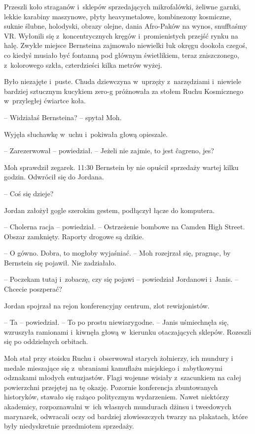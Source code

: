 \documentclass[oneside,polish,11pt,sfheadings]{mwbk}
\let\footnote=\endnote
\begin{document}
Przeszli koło straganów i~sklepów sprzedających mikrofalówki, żeliwne
garnki, lekkie karabiny maszynowe, płyty heavymetalowe, kombinezony
kosmiczne, suknie ślubne, holodyski, obrazy olejne, dania Afro-Paków na
wynos, snufftaśmy VR. Wyłonili się z~koncentrycznych kręgów i~promienistych przejść rynku na halę. Zwykłe miejsce Bernsteina zajmowało
niewielki łuk okręgu dookoła czegoś, co kiedyś musiało być fontanną pod
głównym świetlikiem, teraz zniszczonego, z~kolorowego szkła,
czterdzieści kilka metrów wyżej.

Było niezajęte i~puste. Chuda dziewczyna w~uprzęży z~narzędziami i~niewiele bardziej sztucznym kucykiem zero-g próżnowała za stołem Ruchu
Kosmicznego w~przyległej ćwiartce koła.

-- Widziałaś Bernsteina? -- spytał Moh.

Wyjęła słuchawkę w~uchu i~pokiwała głową opieszale. 

-- Zarezerwował -- powiedział. -- Jeżeli nie zajmie, to jest ĉagreno\footnote{esperanto, rozczarowanie}, jes?

Moh sprawdził zegarek. 11:30 Bernstein by nie opuścił sprzedaży wartej
kilku godzin. Odwrócił się do Jordana. 

-- Coś się dzieje?

Jordan założył gogle szerokim gestem, podłączył łącze do komputera. 

-- Cholerna racja -- powiedział. -- Ostrzeżenie bombowe na Camden High
Street. Obszar zamknięty. Raporty drogowe są dzikie.

-- O gówno. Dobra, to mogłoby wyjaśniać. -- Moh rozejrzał się, pragnąc, by
Bernstein się pojawił. Nie zadziałało.

-- Poczekam tutaj i~zobaczę, czy się pojawi -- powiedział Jordanowi i~Janis. -- Chcecie poszperać?

Jordan spojrzał na rejon konferencyjny centrum, zlot rewizjonistów. 

-- Ta
-- powiedział. -- To po prostu niewiarygodne. -- Janis uśmiechnęła się,
wzruszyła ramionami i~kiwnęła głową w~kierunku otaczających sklepów.
Rozeszli się po oddzielnych orbitach.

Moh stał przy stoisku Ruchu i~obserwował starych żołnierzy, ich mundury
i medale mieszające się z~ubraniami kamuflażu miejskiego i~zabytkowymi
odznakami młodych entuzjastów. Flagi wojenne wisiały z~szacunkiem na
całej powierzchni przejętej na tę okazję. Pozornie konferencja
zbuntowanych historyków, stawało się rażąco politycznym wydarzeniem.
Nawet niektórzy akademicy, rozpoznawalni w~ich własnych mundurach dżinsu
i tweedowych marynarek, odwracali oczy od bardziej złowieszczych twarzy
na plakatach, które były niedyskretnie przedmiotem sprzedaży.
\end{document}
